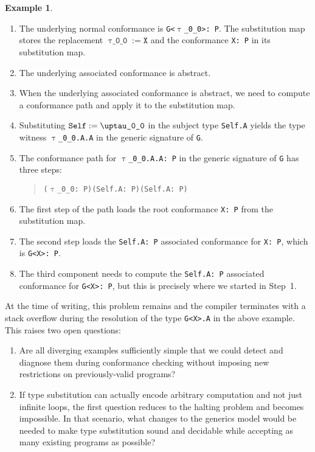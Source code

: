 \documentclass[a4paper,headsepline,bibliography=totoc,toc=flat,fleqn,twoside=semi]{scrbook}
\theoremstyle{definition}
\theoremstyle{definition}
\newtheorem{example}{Example}[chapter]
\theoremstyle{definition}
\newcommand{\ttgp}[2]{\texttt{$\uptau$\_#1\_#2}}
\begin{document}
\begin{example}
\begin{enumerate}
\item The underlying normal conformance is \texttt{G<\ttgp{0}{0}>:\ P}. The substitution map stores the replacement $\ttgp{0}{0}:=\texttt{X}$ and the conformance \texttt{X:\ P} in its substitution map.
\item The underlying associated conformance is abstract.
\item When the underlying associated conformance is abstract, we need to compute a conformance path and apply it to the substitution map.
\item Substituting $\texttt{Self}:=\texttt{\ttgp{0}{0}}$ in the subject type \texttt{Self.A} yields the type witness \texttt{\ttgp{0}{0}.A.A} in the generic signature of \texttt{G}.
\item The conformance path for \texttt{\ttgp{0}{0}.A.A:\ P} in the generic signature of \texttt{G} has three steps:
\begin{quote}
\texttt{(\ttgp{0}{0}:\ P)(Self.A:\ P)(Self.A:\ P)}
\end{quote}
\item The first step of the path loads the root conformance \texttt{X:\ P} from the substitution map.
\item The second step loads the \texttt{Self.A:\ P} associated conformance for \texttt{X:\ P}, which is \texttt{G<X>:\ P}.
\item The third component needs to compute the \texttt{Self.A:\ P} associated conformance for \texttt{G<X>:\ P}, but this is precisely where we started in Step~1.
\end{enumerate}
\end{example}

At the time of writing, this problem remains and the compiler terminates with a stack overflow during the resolution of the type \texttt{G<X>.A} in the above example. This raises two open questions:
\begin{enumerate}
\item Are all diverging examples sufficiently simple that we could detect and diagnose them during conformance checking without imposing new restrictions on previously-valid programs?
\item If type substitution can actually encode arbitrary computation and not just infinite loops, the first question reduces to the halting problem and becomes impossible. In that scenario, what changes to the generics model would be needed to make type substitution sound and decidable while accepting as many existing programs as possible?
\end{enumerate}
\end{document}
